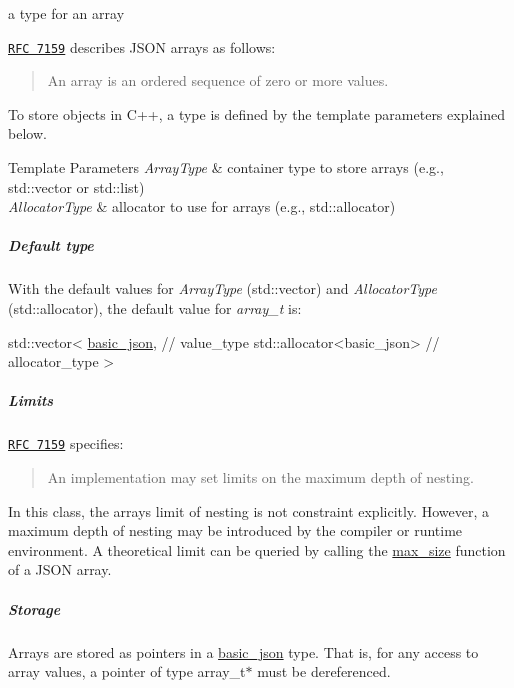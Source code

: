 a type for an array 

\href{http://rfc7159.net/rfc7159}{\tt R\+F\+C 7159} describes J\+S\+O\+N arrays as follows\+: \begin{quote}
An array is an ordered sequence of zero or more values. \end{quote}


To store objects in C++, a type is defined by the template parameters explained below.


\begin{DoxyTemplParams}{Template Parameters}
{\em Array\+Type} & container type to store arrays (e.\+g., {\ttfamily std\+::vector} or {\ttfamily std\+::list}) \\
\hline
{\em Allocator\+Type} & allocator to use for arrays (e.\+g., {\ttfamily std\+::allocator})\\
\hline
\end{DoxyTemplParams}
\subparagraph*{Default type}

With the default values for {\itshape Array\+Type} ({\ttfamily std\+::vector}) and {\itshape Allocator\+Type} ({\ttfamily std\+::allocator}), the default value for {\itshape array\+\_\+t} is\+:


\begin{DoxyCode}
std::vector<
  \hyperlink{classnlohmann_1_1basic__json_a8f77085bd98c97a983d9ba12efbf6148}{basic\_json}, \textcolor{comment}{// value\_type}
  std::allocator<basic\_json> \textcolor{comment}{// allocator\_type}
>
\end{DoxyCode}


\subparagraph*{Limits}

\href{http://rfc7159.net/rfc7159}{\tt R\+F\+C 7159} specifies\+: \begin{quote}
An implementation may set limits on the maximum depth of nesting. \end{quote}


In this class, the array\textquotesingle{}s limit of nesting is not constraint explicitly. However, a maximum depth of nesting may be introduced by the compiler or runtime environment. A theoretical limit can be queried by calling the \hyperlink{classnlohmann_1_1basic__json_ad5514a7435f246fc5335856465022a7a}{max\+\_\+size} function of a J\+S\+O\+N array.

\subparagraph*{Storage}

Arrays are stored as pointers in a \hyperlink{classnlohmann_1_1basic__json}{basic\+\_\+json} type. That is, for any access to array values, a pointer of type {\ttfamily array\+\_\+t$\ast$} must be dereferenced.

